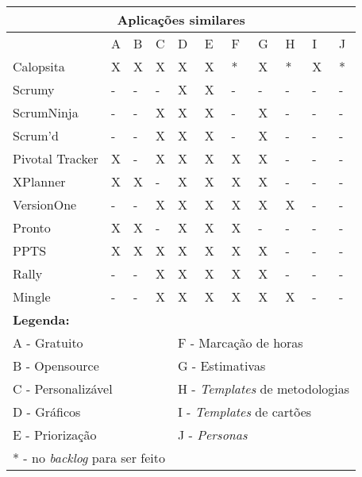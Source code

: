 \begin{tabular}{|l|l|l|l|l|l|l|l|l|l|l|}
	\hline
	\multicolumn{11}{|c|}{Aplicações similares} \\
	\hline
	                & A & B & C & D & E & F & G & H & I & J \\
	Calopsita       & X & X & X & X & X & * & X & * & X & * \\
	Scrumy          & - & - & - & X & X & - & - & - & - & - \\
	ScrumNinja      & - & - & X & X & X & - & X & - & - & - \\
	Scrum'd         & - & - & X & X & X & - & X & - & - & - \\
	Pivotal Tracker & X & - & X & X & X & X & X & - & - & - \\
	XPlanner        & X & X & - & X & X & X & X & - & - & - \\
	VersionOne      & - & - & X & X & X & X & X & X & - & - \\
	Pronto          & X & X & - & X & X & X & - & - & - & - \\
	PPTS            & X & X & X & X & X & X & X & - & - & - \\
	Rally           & - & - & X & X & X & X & X & - & - & - \\
	Mingle          & - & - & X & X & X & X & X & X & - & - \\
	\hline
	\multicolumn{11}{l}{\textbf{Legenda:}} \\
	\multicolumn{4}{l}{A - Gratuito} & \multicolumn{7}{l}{F - Marcação de horas} \\
	\multicolumn{4}{l}{B - Opensource} & \multicolumn{7}{l}{G - Estimativas} \\
	\multicolumn{4}{l}{C - Personalizável} & \multicolumn{7}{l}{H - \textit{Templates} de metodologias} \\
	\multicolumn{4}{l}{D - Gráficos} & \multicolumn{7}{l}{I - \textit{Templates} de cartões} \\
	\multicolumn{4}{l}{E - Priorização} & \multicolumn{7}{l}{J - \textit{Personas}} \\
	\multicolumn{11}{l}{* - no \textit{backlog} para ser feito} \\
\end{tabular}

